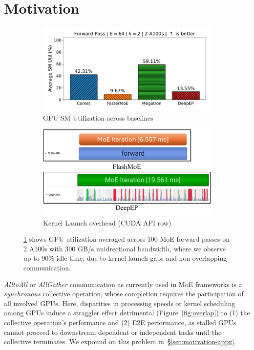 \section{Motivation}\label{sec:motivation}
\begin{figure}[!h]
    \centering
    \begin{subfigure}{0.425\textwidth}
        \centering
        \includegraphics[width=\linewidth, keepaspectratio]{figures/sm_util_b}
        \caption{GPU SM Utilization across baselines}
        \label{sub:util}
    \end{subfigure}
    \begin{subfigure}{0.425\textwidth}
        \centering
        \includegraphics[width=\textwidth, keepaspectratio]{figures/kernel_launch}
        \caption{Kernel Launch overhead (CUDA API row)}
        \label{sub:launch}
    \end{subfigure}
    \caption{\ref{sub:util} shows GPU utilization averaged across 100 MoE forward passes on 2 A100s with
    300 GB/s unidrectional bandwidth, where we observe up to 90\% idle time, due to kernel launch gaps and
    non-overlapping communication.}
    \label{fig:kl}
\end{figure}
 \emph{AlltoAll} or \emph{AllGather} communication as currently used in MoE frameworks
is a \emph{synchronous} collective operation, whose completion requires the participation of all involved GPUs.
Here, disparities in processing speeds or kernel scheduling
among GPUs induce a straggler effect detrimental (Figure~\ref{fig:overlap}) to (1) the collective operation's performance and (2)
E2E performance, as stalled GPUs cannot proceed to downstream dependent or independent tasks until the collective terminates.
We expound on this problem in~\S\ref{sec:motivation-appx}.

